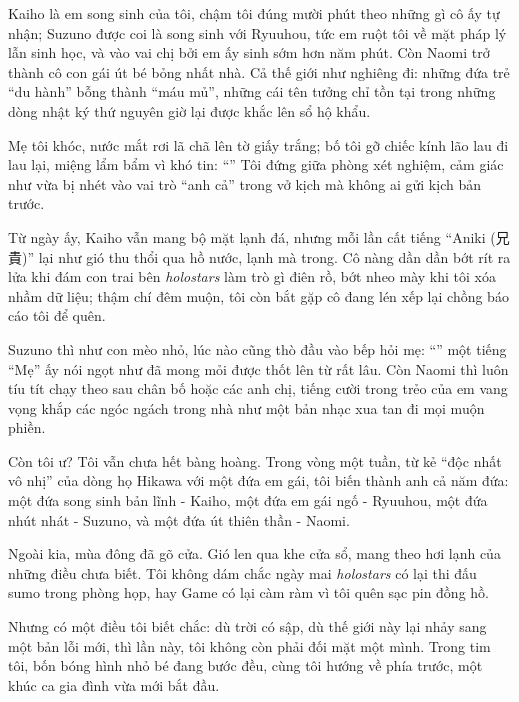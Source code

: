 \documentclass[../main.tex]{subfiles}
\begin{document}
Kaiho là em song sinh của tôi, chậm tôi đúng mười phút theo những gì cô ấy tự nhận; Suzuno được coi là song sinh với Ryuuhou, tức em ruột tôi về mặt pháp lý lẫn sinh học, và vào vai chị bởi em ấy sinh sớm hơn năm phút. Còn Naomi trở thành cô con gái út bé bỏng nhất nhà. Cả thế giới như nghiêng đi: những đứa trẻ ``du hành'' bỗng thành ``máu mủ'', những cái tên tưởng chỉ tồn tại trong những dòng nhật ký thứ nguyên giờ lại được khắc lên sổ hộ khẩu.

Mẹ tôi khóc, nước mắt rơi lã chã lên tờ giấy trắng; bố tôi gỡ chiếc kính lão lau đi lau lại, miệng lẩm bẩm vì khó tin: ``'' Tôi đứng giữa phòng xét nghiệm, cảm giác như vừa bị nhét vào vai trò ``anh cả'' trong vở kịch mà không ai gửi kịch bản trước.

Từ ngày ấy, Kaiho vẫn mang bộ mặt lạnh đá, nhưng mỗi lần cất tiếng ``Aniki (兄貴)'' lại như gió thu thổi qua hồ nước, lạnh mà trong. Cô nàng dần dần bớt rít ra lửa khi đám con trai bên \textit{holostars} làm trò gì điên rồ, bớt nheo mày khi tôi xóa nhầm dữ liệu; thậm chí đêm muộn, tôi còn bắt gặp cô đang lén xếp lại chồng báo cáo tôi để quên.

Suzuno thì như con mèo nhỏ, lúc nào cũng thò đầu vào bếp hỏi mẹ: ``'' một tiếng ``Mẹ'' ấy nói ngọt như đã mong mỏi được thốt lên từ rất lâu. Còn Naomi thì luôn tíu tít chạy theo sau chân bố hoặc các anh chị, tiếng cười trong trẻo của em vang vọng khắp các ngóc ngách trong nhà như một bản nhạc xua tan đi mọi muộn phiền.

Còn tôi ư? Tôi vẫn chưa hết bàng hoàng. Trong vòng một tuần, từ kẻ ``độc nhất vô nhị'' của dòng họ Hikawa với một đứa em gái, tôi biến thành anh cả năm đứa: một đứa song sinh bản lĩnh - Kaiho, một đứa em gái ngố - Ryuuhou, một đứa nhút nhát - Suzuno, và một đứa út thiên thần - Naomi.

Ngoài kia, mùa đông đã gõ cửa. Gió len qua khe cửa sổ, mang theo hơi lạnh của những điều chưa biết. Tôi không dám chắc ngày mai \textit{holostars} có lại thi đấu sumo trong phòng họp, hay Game có lại càm ràm vì tôi quên sạc pin đồng hồ.

Nhưng có một điều tôi biết chắc: dù trời có sập, dù thế giới này lại nhảy sang một bản lỗi mới, thì lần này, tôi không còn phải đối mặt một mình. Trong tim tôi, bốn bóng hình nhỏ bé đang bước đều, cùng tôi hướng về phía trước, một khúc ca gia đình vừa mới bắt đầu.
\end{document}
